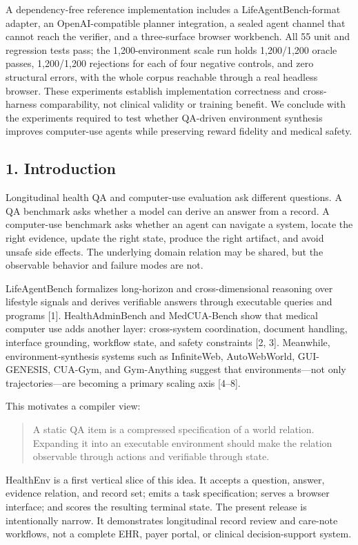 \documentclass[
]{article}
\begin{document}
A dependency-free reference implementation includes a
LifeAgentBench-format adapter, an OpenAI-compatible planner integration,
a sealed agent channel that cannot reach the verifier, and a
three-surface browser workbench. All 55 unit and regression tests pass;
the 1,200-environment scale run holds 1,200/1,200 oracle passes,
1,200/1,200 rejections for each of four negative controls, and zero
structural errors, with the whole corpus reachable through a real
headless browser. These experiments establish implementation correctness
and cross-harness comparability, not clinical validity or training
benefit. We conclude with the experiments required to test whether
QA-driven environment synthesis improves computer-use agents while
preserving reward fidelity and medical safety.

\subsection{1. Introduction}\label{introduction}

Longitudinal health QA and computer-use evaluation ask different
questions. A QA benchmark asks whether a model can derive an answer from
a record. A computer-use benchmark asks whether an agent can navigate a
system, locate the right evidence, update the right state, produce the
right artifact, and avoid unsafe side effects. The underlying domain
relation may be shared, but the observable behavior and failure modes
are not.

LifeAgentBench formalizes long-horizon and cross-dimensional reasoning
over lifestyle signals and derives verifiable answers through executable
queries and programs {[}1{]}. HealthAdminBench and MedCUA-Bench show
that medical computer use adds another layer: cross-system coordination,
document handling, interface grounding, workflow state, and safety
constraints {[}2, 3{]}. Meanwhile, environment-synthesis systems such as
InfiniteWeb, AutoWebWorld, GUI-GENESIS, CUA-Gym, and Gym-Anything
suggest that environments---not only trajectories---are becoming a
primary scaling axis {[}4--8{]}.

This motivates a compiler view:

\begin{quote}
A static QA item is a compressed specification of a world relation.
Expanding it into an executable environment should make the relation
observable through actions and verifiable through state.
\end{quote}

HealthEnv is a first vertical slice of this idea. It accepts a question,
answer, evidence relation, and record set; emits a task specification;
serves a browser interface; and scores the resulting terminal state. The
present release is intentionally narrow. It demonstrates longitudinal
record review and care-note workflows, not a complete EHR, payer portal,
or clinical decision-support system.
\end{document}

